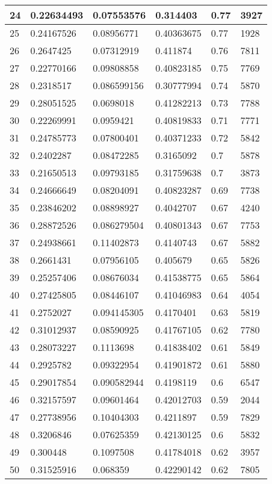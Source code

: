\begin{longtable}{|l|l|l|l|l|l|}
24 & 0.22634493 & 0.07553576 & 0.314403 & 0.77 & 3927 \\ \hline 
25 & 0.24167526 & 0.08956771 & 0.40363675 & 0.77 & 1928 \\ \hline 
26 & 0.2647425 & 0.07312919 & 0.411874 & 0.76 & 7811 \\ \hline 
27 & 0.22770166 & 0.09808858 & 0.40823185 & 0.75 & 7769 \\ \hline 
28 & 0.2318517 & 0.086599156 & 0.30777994 & 0.74 & 5870 \\ \hline 
29 & 0.28051525 & 0.0698018 & 0.41282213 & 0.73 & 7788 \\ \hline 
30 & 0.22269991 & 0.0959421 & 0.40819833 & 0.71 & 7771 \\ \hline 
31 & 0.24785773 & 0.07800401 & 0.40371233 & 0.72 & 5842 \\ \hline 
32 & 0.2402287 & 0.08472285 & 0.3165092 & 0.7 & 5878 \\ \hline 
33 & 0.21650513 & 0.09793185 & 0.31759638 & 0.7 & 3873 \\ \hline 
34 & 0.24666649 & 0.08204091 & 0.40823287 & 0.69 & 7738 \\ \hline 
35 & 0.23846202 & 0.08898927 & 0.4042707 & 0.67 & 4240 \\ \hline 
36 & 0.28872526 & 0.086279504 & 0.40801343 & 0.67 & 7753 \\ \hline 
37 & 0.24938661 & 0.11402873 & 0.4140743 & 0.67 & 5882 \\ \hline 
38 & 0.2661431 & 0.07956105 & 0.405679 & 0.65 & 5826 \\ \hline 
39 & 0.25257406 & 0.08676034 & 0.41538775 & 0.65 & 5864 \\ \hline 
40 & 0.27425805 & 0.08446107 & 0.41046983 & 0.64 & 4054 \\ \hline 
41 & 0.2752027 & 0.094145305 & 0.4170401 & 0.63 & 5819 \\ \hline 
42 & 0.31012937 & 0.08590925 & 0.41767105 & 0.62 & 7780 \\ \hline 
43 & 0.28073227 & 0.1113698 & 0.41838402 & 0.61 & 5849 \\ \hline 
44 & 0.2925782 & 0.09322954 & 0.41901872 & 0.61 & 5880 \\ \hline 
45 & 0.29017854 & 0.090582944 & 0.4198119 & 0.6 & 6547 \\ \hline 
46 & 0.32157597 & 0.09601464 & 0.42012703 & 0.59 & 2044 \\ \hline 
47 & 0.27738956 & 0.10404303 & 0.4211897 & 0.59 & 7829 \\ \hline 
48 & 0.3206846 & 0.07625359 & 0.42130125 & 0.6 & 5832 \\ \hline 
49 & 0.300448 & 0.1097508 & 0.41784018 & 0.62 & 3957 \\ \hline 
50 & 0.31525916 & 0.068359 & 0.42290142 & 0.62 & 7805 \\ \hline 
\end{longtable}